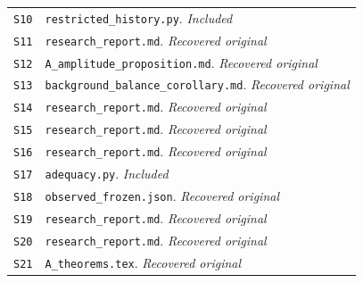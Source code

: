 \begin{longtable}{@{}>{\raggedright\arraybackslash}p{}>{\raggedright\arraybackslash}p{}@{}}
\hypertarget{S10}{}\label{source:S10}\texttt{S10} & \nolinkurl{restricted_history.py}. \textit{Included} \\
\hypertarget{S11}{}\label{source:S11}\texttt{S11} & \nolinkurl{research_report.md}. \textit{Recovered original} \\
\hypertarget{S12}{}\label{source:S12}\texttt{S12} & \nolinkurl{A_amplitude_proposition.md}. \textit{Recovered original} \\
\hypertarget{S13}{}\label{source:S13}\texttt{S13} & \nolinkurl{background_balance_corollary.md}. \textit{Recovered original} \\
\hypertarget{S14}{}\label{source:S14}\texttt{S14} & \nolinkurl{research_report.md}. \textit{Recovered original} \\
\hypertarget{S15}{}\label{source:S15}\texttt{S15} & \nolinkurl{research_report.md}. \textit{Recovered original} \\
\hypertarget{S16}{}\label{source:S16}\texttt{S16} & \nolinkurl{research_report.md}. \textit{Recovered original} \\
\hypertarget{S17}{}\label{source:S17}\texttt{S17} & \nolinkurl{adequacy.py}. \textit{Included} \\
\hypertarget{S18}{}\label{source:S18}\texttt{S18} & \nolinkurl{observed_frozen.json}. \textit{Recovered original} \\
\hypertarget{S19}{}\label{source:S19}\texttt{S19} & \nolinkurl{research_report.md}. \textit{Recovered original} \\
\hypertarget{S20}{}\label{source:S20}\texttt{S20} & \nolinkurl{research_report.md}. \textit{Recovered original} \\
\hypertarget{S21}{}\label{source:S21}\texttt{S21} & \nolinkurl{A_theorems.tex}. \textit{Recovered original} \\

\end{longtable}
